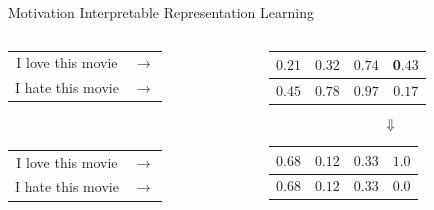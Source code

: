 \documentclass{beamer}
\begin{document}
\begin{frame}{Motivation}
	\centering
	{\Large Interpretable Representation Learning} \\
	\vspace{1cm}
	\begin{columns}[T] %
		\begin{column}{.3\textwidth}
			\centering
			\begin{tabular}{ c c }
				I love this movie & $\rightarrow$ \\
				I hate this movie & $\rightarrow$ \\
			\end{tabular}\\
			\vspace{1.8cm}
			\begin{tabular}{ c c }
				I love this movie & $\rightarrow$ \\
				I hate this movie & $\rightarrow$ \\
			\end{tabular}
		\end{column}
		\hfill
		\begin{column}{.6\textwidth}
			\centering
			\begin{tabular}{ | c | c | c | c | }
				\hline
				$0.21$ & $0.32$ & $0.74$ & 0$.43$ \\
				\hline
				$0.45$ & $0.78$ & $0.97$ & 0$.17$ \\
				\hline
			\end{tabular}
			{\Huge$$\Downarrow$$}
			\begin{tabular}{ | c | c | c | c | }
				\hline
				$0.68$ & $0.12$ & $0.33$ & {\color{red}$1.0$} \\
				\hline
				\hline
				$0.68$ & $0.12$ & $0.33$ & {\color{red}$0.0$} \\
				\hline
			\end{tabular}
		\end{column}
	\end{columns}
\end{frame}
\end{document}
